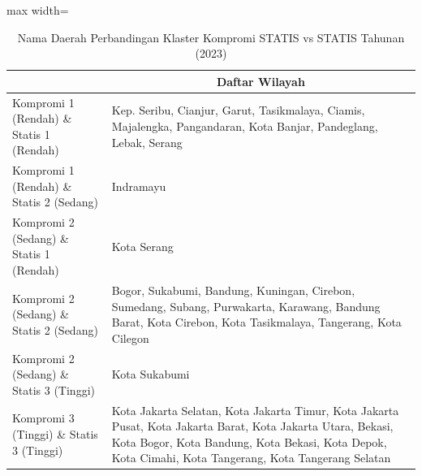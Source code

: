 \begin{table}[H]
\centering
\caption{Nama Daerah Perbandingan Klaster Kompromi STATIS vs STATIS Tahunan (2023)} \label{tab:app1comp_statis_name_2023}
\begin{adjustbox}{max width=\textwidth}
\begin{tabular}{|>{\centering\arraybackslash}p{4cm}|p{10cm}|}
\hline
\multicolumn{1}{|c|}{\textbf{Kategori}} & \multicolumn{1}{c|}{\textbf{Daftar Wilayah}} \\
\hline
Kompromi 1 (Rendah) \& Statis 1 (Rendah) & Kep. Seribu, Cianjur, Garut, Tasikmalaya, Ciamis, Majalengka, Pangandaran, Kota Banjar, Pandeglang, Lebak, Serang \\
\hline
Kompromi 1 (Rendah) \& Statis 2 (Sedang) & Indramayu \\
\hline
Kompromi 2 (Sedang) \& Statis 1 (Rendah) & Kota Serang \\
\hline
Kompromi 2 (Sedang) \& Statis 2 (Sedang) & Bogor, Sukabumi, Bandung, Kuningan, Cirebon, Sumedang, Subang, Purwakarta, Karawang, Bandung Barat, Kota Cirebon, Kota Tasikmalaya, Tangerang, Kota Cilegon \\
\hline
Kompromi 2 (Sedang) \& Statis 3 (Tinggi) & Kota Sukabumi \\
\hline
Kompromi 3 (Tinggi) \& Statis 3 (Tinggi) & Kota Jakarta Selatan, Kota Jakarta Timur, Kota Jakarta Pusat, Kota Jakarta Barat, Kota Jakarta Utara, Bekasi, Kota Bogor, Kota Bandung, Kota Bekasi, Kota Depok, Kota Cimahi, Kota Tangerang, Kota Tangerang Selatan \\
\hline
\end{tabular}
\end{adjustbox}
\end{table}